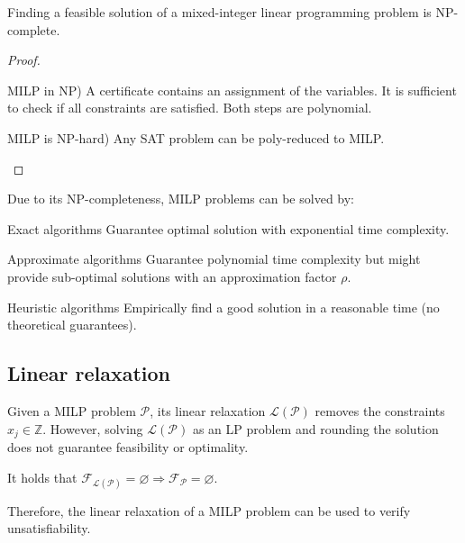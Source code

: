 \begin{theorem}
    Finding a feasible solution of a mixed-integer linear programming problem is NP-complete.

    \begin{proof}
        \phantom{}
        \begin{descriptionlist}
            \item[MILP in NP)] 
                A certificate contains an assignment of the variables. It is sufficient to check if all constraints are satisfied.
                Both steps are polynomial.
            \item[MILP is NP-hard)] 
                Any SAT problem can be poly-reduced to MILP.
        \end{descriptionlist}
    \end{proof}
\end{theorem}

\begin{remark}
    Due to its NP-completeness, MILP problems can be solved by:
    \begin{descriptionlist}
        \item[Exact algorithms] Guarantee optimal solution with exponential time complexity.
        \item[Approximate algorithms] Guarantee polynomial time complexity but might provide sub-optimal solutions with an approximation factor $\rho$.
        \item[Heuristic algorithms] Empirically find a good solution in a reasonable time (no theoretical guarantees).
    \end{descriptionlist}
\end{remark}


\subsection{Linear relaxation}

Given a MILP problem $\mathcal{P}$, its linear relaxation $\mathcal{L}(\mathcal{P})$ removes the constraints $x_j \in \mathbb{Z}$.
However, solving $\mathcal{L}(\mathcal{P})$ as an LP problem and rounding the solution does not guarantee feasibility or optimality.

\begin{theorem}
    It holds that $\mathcal{F}_{\mathcal{L}(\mathcal{P})} = \varnothing \Rightarrow \mathcal{F}_\mathcal{P} = \varnothing$.

    Therefore, the linear relaxation of a MILP problem can be used to verify unsatisfiability.
\end{theorem}

